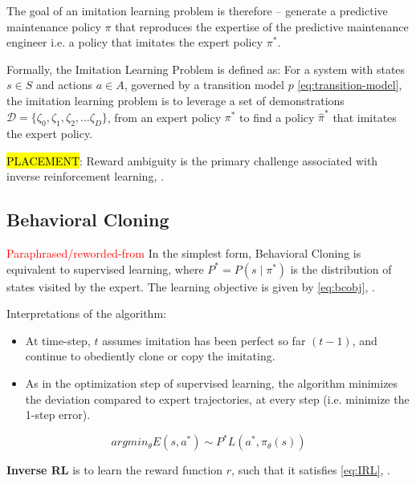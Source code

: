 \documentclass{article}
\newcommand{\hlc}[2][blue!10]{{\colorlet{foo}{#1} \sethlcolor{foo}\hl{#2}}}
\begin{document}
The goal of an imitation learning problem is therefore -- generate a predictive maintenance policy $\pi$ that reproduces the expertise of the predictive maintenance engineer i.e. a policy that imitates the expert policy $\pi^{*}$.

Formally, the Imitation Learning Problem is defined as: For a system with states $s \in S$ and actions $a \in A$, governed by a transition model $p$ \eqref{eq:transition-model}, the imitation learning problem is to leverage a set of demonstrations $\mathcal{D} = \{\zeta_0, \zeta_1, \zeta_2, ... \zeta_D\}$, from an expert policy  $\pi^{*}$ to find a policy  $\hat{\pi}^{*}$ that imitates the expert policy.

\hlc{PLACEMENT}: Reward ambiguity is the primary challenge associated with inverse reinforcement learning, \citep{ng2000algorithms, stanford-lectures, baheri2023}.


\subsection{Behavioral Cloning} 
\textcolor{red}{Paraphrased/reworded-from \cite{yue2018imitation}}
In the simplest form, Behavioral Cloning is equivalent to supervised learning, where $P^* = P(s\mid\pi^*)$ is the distribution of states visited by the expert. The learning objective is given by \eqref{eq:bcobj}, \cite{yue2018imitation}. 

Interpretations of the algorithm:
\begin{itemize}
	\item At time-step, $t$ assumes imitation has been perfect so far $(t-1)$, and continue to obediently clone or copy the imitating.
	\item As in the optimization step of supervised learning, the algorithm minimizes the deviation compared to expert trajectories, at every step (i.e. minimize the 1-step error).
\end{itemize}

\begin{equation}\label{eq:bcobj}
	argmin_\theta E(s,a^*) \sim P^* L(a^*, \pi_{\theta}(s))	
\end{equation}

\textbf{Inverse RL} is to learn the reward function $r$, such that it satisfies \eqref{eq:IRL}, \cite{yue2018imitation}.
\end{document}
